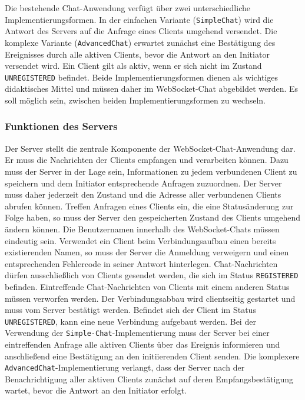 \documentclass[11pt,a4paper,titlepage]{scrartcl}
\numberwithin{equation}{section}
\begin{document}
\noindent Die bestehende Chat-Anwendung verfügt über zwei unterschiedliche Implementierungsformen. In der einfachen Variante (\texttt{SimpleChat}) wird die Antwort des Servers auf die Anfrage eines Clients umgehend versendet. Die komplexe Variante (\texttt{AdvancedChat}) erwartet zunächst eine Bestätigung des Ereignisses durch alle aktiven Clients, bevor die Antwort an den Initiator versendet wird. Ein Client gilt als aktiv, wenn er sich nicht im Zustand \texttt{UNREGISTERED} befindet. Beide Implementierungsformen dienen als wichtiges didaktisches Mittel und müssen daher im WebSocket-Chat abgebildet werden. Es soll möglich sein, zwischen beiden Implementierungsformen zu wechseln.

\subsubsection*{Funktionen des Servers}
Der Server stellt die zentrale Komponente der WebSocket-Chat-Anwendung dar. Er muss die Nachrichten der Clients empfangen und verarbeiten können. Dazu muss der Server in der Lage sein, Informationen zu jedem verbundenen Client zu speichern und dem Initiator entsprechende Anfragen zuzuordnen. Der Server muss daher jederzeit den Zustand und die Adresse aller verbundenen Clients abrufen können. Treffen Anfragen eines Clients ein, die eine Statusänderung zur Folge haben, so muss der Server den gespeicherten Zustand des Clients umgehend ändern können. Die Benutzernamen innerhalb des WebSocket-Chats müssen eindeutig sein. Verwendet ein Client beim Verbindungsaufbau einen bereits existierenden Namen, so muss der Server die Anmeldung verweigern und einen entsprechenden Fehlercode in seiner Antwort hinterlegen. Chat-Nachrichten dürfen ausschließlich von Clients gesendet werden, die sich im Status \texttt{REGISTERED} befinden. Eintreffende Chat-Nachrichten von Clients mit einem anderen Status müssen verworfen werden. Der Verbindungsabbau wird clientseitig gestartet und muss vom Server bestätigt werden. Befindet sich der Client im Status \texttt{UNREGISTERED}, kann eine neue Verbindung aufgebaut werden. Bei der Verwendung der \texttt{Simple-Chat}-Implementierung muss der Server bei einer eintreffenden Anfrage alle aktiven Clients über das Ereignis informieren und anschließend eine Bestätigung an den initiierenden Client senden. Die komplexere \texttt{AdvancedChat}-Implementierung verlangt, dass der Server nach der Benachrichtigung aller aktiven Clients zunächst auf deren Empfangsbestätigung wartet, bevor die Antwort an den Initiator erfolgt.
\end{document}

